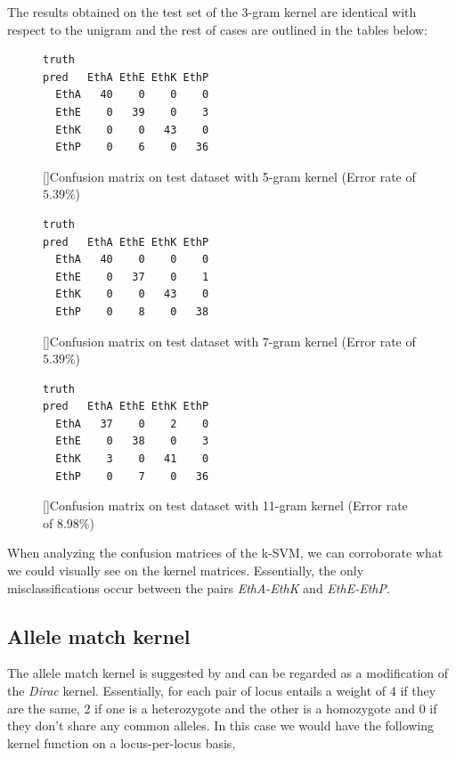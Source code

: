 \documentclass[a4paper, 11pt]{article}
\theoremstyle{definition}
\theoremstyle{remark}
\begin{document}
The results obtained on the test set of the $3$-gram kernel are identical with respect to the unigram and the rest of cases are outlined in the tables below:


\begin{figure}[!h]
\centering
\begin{BVerbatim}[baselinestretch=1]
      truth
pred   EthA EthE EthK EthP
  EthA   40    0    0    0
  EthE    0   39    0    3
  EthK    0    0   43    0
  EthP    0    6    0   36
\end{BVerbatim}    
[]{Confusion matrix on test dataset with 5-gram kernel (Error rate of $5.39\%$)}
\end{figure}



\begin{figure}[!h]
\centering
\begin{BVerbatim}[baselinestretch=1]
      truth
pred   EthA EthE EthK EthP
  EthA   40    0    0    0
  EthE    0   37    0    1
  EthK    0    0   43    0
  EthP    0    8    0   38
\end{BVerbatim}    
[]{Confusion matrix on test dataset with 7-gram kernel (Error rate of $5.39\%$)}
\end{figure}



\begin{figure}[!h]
\centering
\begin{BVerbatim}[baselinestretch=1]
      truth
pred   EthA EthE EthK EthP
  EthA   37    0    2    0
  EthE    0   38    0    3
  EthK    3    0   41    0
  EthP    0    7    0   36
\end{BVerbatim}    
[]{Confusion matrix on test dataset with 11-gram kernel (Error rate of $8.98\%$)}
\end{figure}


When analyzing the confusion matrices of the k-SVM, we can corroborate what we could visually see on the kernel matrices. Essentially, the only misclassifications occur between the pairs \textit{EthA-EthK} and \textit{EthE-EthP}.



\newpage


\subsection{Allele match kernel}


The allele match kernel is suggested by \cite{KernelMeasuresGenotypes} and can be regarded as a modification of the \textit{Dirac} kernel. Essentially, for each pair of locus entails a weight of 4 if they are the same, 2 if one is a heterozygote and the other is a homozygote and 0 if they don’t share any common alleles. In this case we would have the following kernel function on a locus-per-locus basis,
\end{document}
